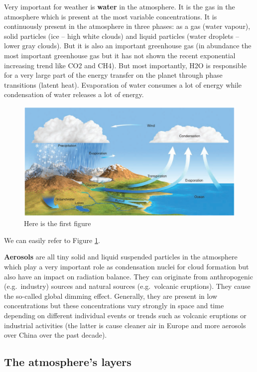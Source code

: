 \documentclass[oneside]{book}
\begin{document}
Very important for weather is \textbf{water} in the atmosphere. It is
the gas in the atmosphere which is present at the most variable
concentrations. It is continuously present in the atmosphere in three
phases: as a gas (water vapour), solid particles (ice -- high white
clouds) and liquid particles (water droplets -- lower gray clouds). But
it is also an important greenhouse gas (in abundance the most important
greenhouse gas but it has not shown the recent exponential increasing
trend like CO2 and CH4). But most importantly, H2O is responsible for a
very large part of the energy transfer on the planet through phase
transitions (latent heat). Evaporation of water consumes a lot of energy
while condensation of water releases a lot of energy.

\begin{figure}

{\centering \includegraphics[width=0.8\linewidth]{figures/Figure11} 

}

\caption{Here is the first figure}\label{fig:intro}
\end{figure}

We can easily refer to Figure \ref{fig:intro}.

\textbf{Aerosols} are all tiny solid and liquid suspended particles in
the atmosphere which play a very important role as condensation nuclei
for cloud formation but also have an impact on radiation balance. They
can originate from anthropogenic (e.g.~industry) sources and natural
sources (e.g.~volcanic eruptions). They cause the so-called global
dimming effect. Generally, they are present in low concentrations but
these concentrations vary strongly in space and time depending on
different individual events or trends such as volcanic eruptions or
industrial activities (the latter is cause cleaner air in Europe and
more aerosols over China over the past decade).

\subsection{The atmosphere's layers}\label{the-atmospheres-layers}
\end{document}

